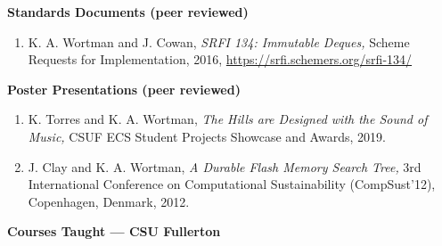 \documentclass[11pt]{letter}
\begin{document}
\renewcommand{\labelenumi}{S-\arabic{enumi}.}
\textbf{Standards Documents (peer reviewed)}
\begin{enumerate}
\item \label{item:srfi134} K. A. Wortman and J. Cowan,
  \emph{SRFI 134: Immutable Deques,}
  Scheme Requests for Implementation, 2016,
  \url{https://srfi.schemers.org/srfi-134/}
\end{enumerate}

\renewcommand{\labelenumi}{P-\arabic{enumi}.}
\textbf{Poster Presentations (peer reviewed)}
\begin{enumerate}
  \item \label{item:hills} K. Torres and K. A. Wortman,
  \emph{The Hills are Designed with the Sound of Music,}
  CSUF ECS Student Projects Showcase and Awards, 2019.
\item \label{item:fmtree} J. Clay and K. A. Wortman, \emph{A Durable Flash Memory Search Tree,} 3rd International Conference on Computational Sustainability (CompSust'12), Copenhagen, Denmark, 2012.
\end{enumerate}

\renewcommand{\labelenumi}{\arabic{enumi}.}


\textbf{Courses Taught --- CSU Fullerton}
\end{document}

